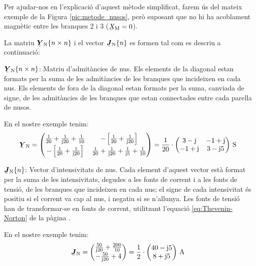 Per ajudar-nos en l'explicaci\'{o} d'aquest m\`{e}tode simplificat, farem \'{u}s
del mateix exemple de la Figura \vref{pic:metode_nusos}, per\`{o}
suposant que no hi ha acoblament magn\`{e}tic entre les branques 2 i 3
($\cmplx{X}\ped{M}=0$).

La matriu $\mcmplx{Y}\ped{N}\{n \times n\}$ i el vector $\mcmplx{J}\ped{N}\{n\}$ es formen tal com es descriu a continuaci\'{o}:

\begin{list}{}
   {\setlength{\labelwidth}{20mm} \setlength{\leftmargin}{22mm} \setlength{\labelsep}{2mm}}

   \item[$\mcmplx{Y}\ped{N}\{n \times n\}$:] Matriu d'admit\`{a}ncies de nus. Els elements de la diagonal estan formats per la suma de les admit\`{a}ncies de les branques que incideixen en cada nus.
   Els elements de fora de la diagonal estan formats per la suma, canviada de signe, de les admit\`{a}ncies de les branques que estan connectades entre cada parella de nusos.

   En el nostre exemple tenim:
   \[
      \mcmplx{Y}\ped{N} =
      \begin{pmatrix}
            \frac{1}{20} + \frac{1}{\ju 20} +  \frac{1}{10} &
            -\left[\frac{1}{20} + \frac{1}{\ju 20}\right] \\
            -\left[\frac{1}{20} + \frac{1}{\ju 20}\right]  &
            \frac{1}{20} + \frac{1}{\ju 20} +  \frac{1}{\ju 5} + \frac{1}{10}
      \end{pmatrix} =
      \frac{1}{20} \cdot \begin{pmatrix}
            3 - \ju  & -1 + \ju \\ -1 + \ju & 3 - \ju 5
      \end{pmatrix}\unit{S}
   \]

   \item[$\mcmplx{J}\ped{N}\{n\}$:] Vector
d'intensivitats de nus. Cada element d'aquest vector est\`{a} format per la suma de
les intensivitats, degudes a les fonts de corrent i a les fonts de tensi\'{o}, de les
branques que incideixen en cada nus; el signe de cada intensivitat \'{e}s positiu si el
corrent va cap al nus, i negatiu si se n'allunya. Les fonts de tensi\'{o} han de
transformar-se en fonts de corrent, utilitzant l'equaci\'{o} \eqref{eq:Thevenin-Norton} de
la p\`{a}gina \pageref{eq:Thevenin-Norton}.

   En el nostre exemple tenim:
   \[
      \mcmplx{J}\ped{N} =
      \begin{pmatrix}
            \frac{50}{\ju 20} +  \frac{200}{10} \\
            - \frac{50}{\ju 20} + 4
      \end{pmatrix} =
      \frac{1}{2} \cdot \begin{pmatrix}
            40 - \ju 5 \\
            8 + \ju 5
      \end{pmatrix}\unit{A}
   \]

\end{list}

